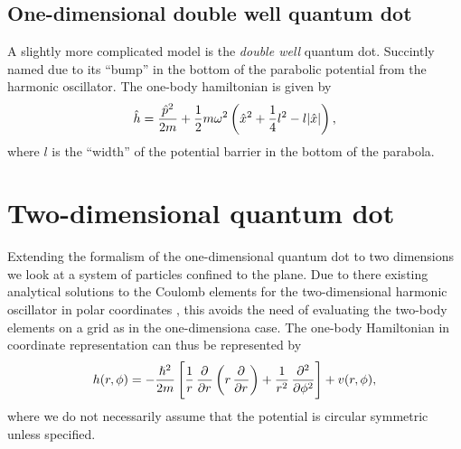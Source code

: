     \subsection{One-dimensional double well quantum dot}
        A slightly more complicated model is the \emph{double well} quantum dot.
        Succintly named due to its ``bump'' in the bottom of the parabolic
        potential from the harmonic oscillator. The one-body hamiltonian is
        given by
        \begin{align}
            \hat{h} = \frac{\hat{p}^2}{2m}
            + \frac{1}{2} m\omega^2\left( 
                \hat{x}^2
                + \frac{1}{4}l^2
                - l\abs{\hat{x}}
             \right),
        \end{align}
        where $l$ is the ``width'' of the potential barrier in the bottom of the
        parabola.

\section{Two-dimensional quantum dot}
    Extending the formalism of the one-dimensional quantum dot to two dimensions
    we look at a system of particles confined to the plane.
    Due to there existing analytical solutions to the Coulomb elements for the
    two-dimensional harmonic oscillator in polar coordinates
    \cite{anisimovas1998energy}, this avoids the need of evaluating the two-body
    elements on a grid as in the one-dimensiona case.
    The one-body Hamiltonian in coordinate representation can thus be
    represented by
    \begin{align}
        \oneten(r, \phi)
        = -\frac{\hslash^2}{2m}\brak{
            \frac{1}{r}\dpd{}{r}\para{
                r\dpd{}{r}
            }
            + \frac{1}{r^2}\dpd[2]{}{\phi}
        }
        + v(r, \phi),
    \end{align}
    where we do not necessarily assume that the potential is circular symmetric
    unless specified.

